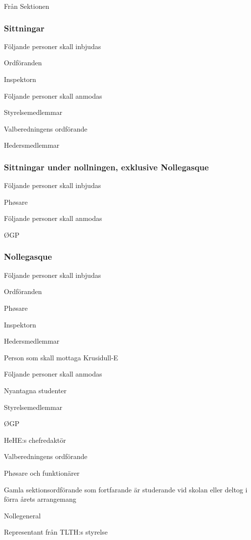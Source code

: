\documentclass[10pt]{article}
\begin{document}
Från Sektionen

\subsubsection*{Sittningar}
Följande personer skall inbjudas
\begin{dashlist}
\item Ordföranden
\item Inspektorn
\end{dashlist}
Följande personer skall anmodas
\begin{dashlist}
\item Styrelsemedlemmar
\item Valberedningens ordförande
\item Hedersmedlemmar
\end{dashlist}

\subsubsection*{Sittningar under nollningen, exklusive Nollegasque}
Följande personer skall inbjudas
\begin{dashlist}
    \item Phøsare
\end{dashlist}
Följande personer skall anmodas
\begin{dashlist}
    \item ØGP
\end{dashlist}

\subsubsection*{Nollegasque}
Följande personer skall inbjudas
\begin{dashlist}
\item Ordföranden
\item Phøsare
\item Inspektorn
\item Hedersmedlemmar
\item Person som skall mottaga Krusidull-E
\end{dashlist}
Följande personer skall anmodas
\begin{dashlist}
\item Nyantagna studenter 
\item Styrelsemedlemmar
\item ØGP
\item HeHE:s chefredaktör
\item Valberedningens ordförande
\item Phøsare och funktionärer
\item Gamla sektionsordförande som fortfarande är studerande vid skolan
eller deltog i förra årets
arrangemang
\item Nollegeneral
\item Representant från TLTH:s styrelse
\end{dashlist}
\end{document}
